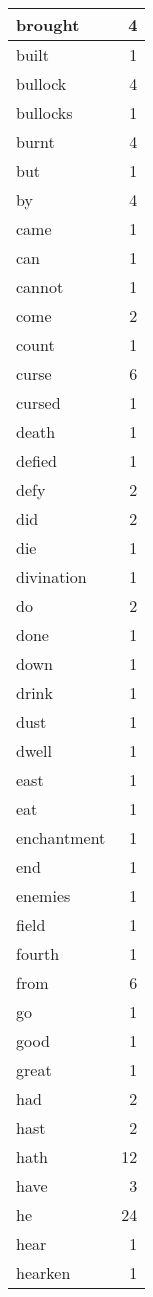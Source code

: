 \begin{center}
\begin{longtable}{l|r}
brought & 4\\ \hline 
built & 1\\ \hline 
bullock & 4\\ \hline 
bullocks & 1\\ \hline 
burnt & 4\\ \hline 
but & 1\\ \hline 
by & 4\\ \hline 
came & 1\\ \hline 
can & 1\\ \hline 
cannot & 1\\ \hline 
come & 2\\ \hline 
count & 1\\ \hline 
curse & 6\\ \hline 
cursed & 1\\ \hline 
death & 1\\ \hline 
defied & 1\\ \hline 
defy & 2\\ \hline 
did & 2\\ \hline 
die & 1\\ \hline 
divination & 1\\ \hline 
do & 2\\ \hline 
done & 1\\ \hline 
down & 1\\ \hline 
drink & 1\\ \hline 
dust & 1\\ \hline 
dwell & 1\\ \hline 
east & 1\\ \hline 
eat & 1\\ \hline 
enchantment & 1\\ \hline 
end & 1\\ \hline 
enemies & 1\\ \hline 
field & 1\\ \hline 
fourth & 1\\ \hline 
from & 6\\ \hline 
go & 1\\ \hline 
good & 1\\ \hline 
great & 1\\ \hline 
had & 2\\ \hline 
hast & 2\\ \hline 
hath & 12\\ \hline 
have & 3\\ \hline 
he & 24\\ \hline 
hear & 1\\ \hline 
hearken & 1\\ \hline 

\end{longtable}
\end{center}
